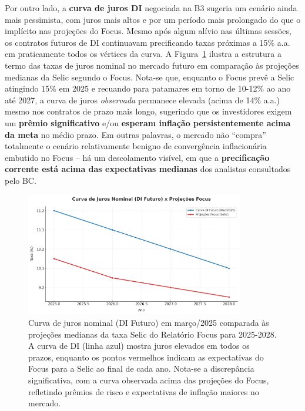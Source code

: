 \documentclass[a4paper,12pt]{article}
\begin{document}
Por outro lado, a \textbf{curva de juros DI} negociada na B3 sugeria um cenário ainda mais pessimista, com juros mais altos e por um período mais prolongado do que o implícito nas projeções do Focus. Mesmo após algum alívio nas últimas sessões, os contratos futuros de DI continuavam precificando taxas próximas a 15\% a.a. em praticamente todos os vértices da curva. A Figura~\ref{fig:curva} ilustra a estrutura a termo das taxas de juros nominal no mercado futuro em comparação às projeções medianas da Selic segundo o Focus. Nota-se que, enquanto o Focus prevê a Selic atingindo 15\% em 2025 e recuando para patamares em torno de 10-12\% ao ano até 2027, a curva de juros \emph{observada} permanece elevada (acima de 14\% a.a.) mesmo nos contratos de prazo mais longo, sugerindo que os investidores exigem um \textbf{prêmio significativo} e/ou \textbf{esperam inflação persistentemente acima da meta} no médio prazo. Em outras palavras, o mercado não ``compra'' totalmente o cenário relativamente benigno de convergência inflacionária embutido no Focus -- há um descolamento visível, em que a \textbf{precificação corrente está acima das expectativas medianas} dos analistas consultados pelo BC.

\begin{figure}[H]
\centering 
\includegraphics[width=0.85\textwidth]{image.png}

\caption{Curva de juros nominal (DI Futuro) em março/2025 comparada às projeções medianas da taxa Selic do Relatório Focus para 2025-2028. A curva de DI (linha azul) mostra juros elevados em todos os prazos, enquanto os pontos vermelhos indicam as expectativas do Focus para a Selic ao final de cada ano. Nota-se a discrepância significativa, com a curva observada acima das projeções do Focus, refletindo prêmios de risco e expectativas de inflação maiores no mercado.}
\label{fig:curva}
\end{figure}
\end{document}
